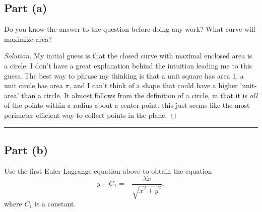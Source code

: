 \documentclass[letterpaper, 12pt]{amsart}
\theoremstyle{definition}  							%
\begin{document}
		\subsection*{Part (a)}
		Do you know the answer to the question before doing any work? 
		What curve will maximize area?

		\begin{proof}[Solution]
		My initial guess is that the closed curve with maximal enclosed area is a circle.
		I don't have a great explanation behind the intuition leading me to this guess.
		The best way to phrase my thinking is that a unit square has area 1, a unit circle has area $\pi$, and I can't think of a shape that could have a higher 'unit-area' than a circle.
		It almost follows from the definition of a circle, in that it is \emph{all} of the points within a radius about a center point; this just seems like the most perimeter-efficient way to collect points in the plane.
		\end{proof}
		\vspace*{2mm}
		\hrule
		\vspace*{2mm}
		\pagebreak

		\subsection*{Part (b)}
		Use the first Euler-Lagrange equation above to obtain the equation $$y - C_{1} = -\frac{\lambda\dot{x}}{\sqrt{\dot{x}^{2} + \dot{y}^{2}}},$$ where $C_{1}$ is a constant.
\end{document}
